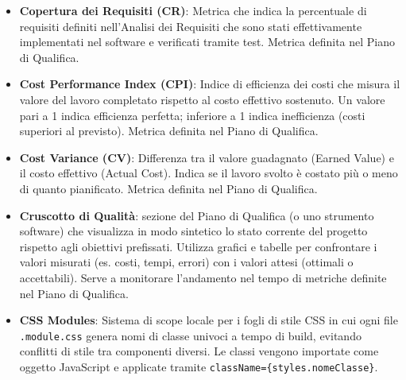 \documentclass[11pt,a4paper]{article}
\begin{document}
\begin{itemize}
\item \textbf{Copertura dei Requisiti (CR)}: Metrica che indica la percentuale di requisiti definiti nell'Analisi dei Requisiti che sono stati effettivamente implementati nel software e verificati tramite test. Metrica definita nel Piano di Qualifica.

\item \textbf{Cost Performance Index (CPI)}: Indice di efficienza dei costi che misura il valore del lavoro completato rispetto al costo effettivo sostenuto. Un valore pari a 1 indica efficienza perfetta; inferiore a 1 indica inefficienza (costi superiori al previsto). Metrica definita nel Piano di Qualifica.

\item \textbf{Cost Variance (CV)}: Differenza tra il valore guadagnato (Earned Value) e il costo effettivo (Actual Cost). Indica se il lavoro svolto è costato più o meno di quanto pianificato. Metrica definita nel Piano di Qualifica.

\item \textbf{Cruscotto di Qualità}: sezione del Piano di Qualifica (o uno strumento software) che visualizza in modo sintetico lo stato corrente del progetto rispetto agli obiettivi prefissati. Utilizza grafici e tabelle per confrontare i valori misurati (es. costi, tempi, errori) con i valori attesi (ottimali o accettabili). Serve a monitorare l'andamento nel tempo di metriche definite nel Piano di Qualifica.

\item \textbf{CSS Modules}: Sistema di scope locale per i fogli di stile 
CSS in cui ogni file \texttt{.module.css} genera nomi di classe univoci 
a tempo di build, evitando conflitti di stile tra componenti diversi. 
Le classi vengono importate come oggetto JavaScript e applicate tramite 
\texttt{className=\{styles.nomeClasse\}}.

\end{itemize}
\newpage
\end{document}
